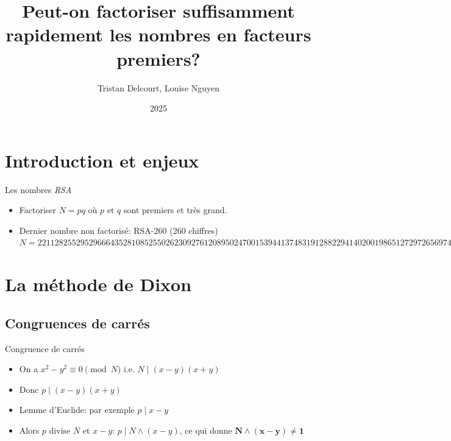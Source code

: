 \documentclass{beamer}
\title{Peut-on factoriser suffisamment rapidement les nombres en facteurs premiers?}
\author{Tristan Delcourt, Louise Nguyen}
\date{2025}
\begin{document}
\begin{frame}[plain]
    \titlepage
\end{frame}

\section{Introduction et enjeux}
\begin{frame}{Les nombres \textit{RSA}}

\begin{itemize}
    \item Factoriser $N = pq$ où $p$ et $q$ sont premiers et très grand.
    \item Dernier nombre non factorisé: RSA-260 (260 chiffres)
        \newline
        \newline
        $N=221128255295296664352810852550262309276120895\allowbreak
        0247001539441374831912882294140200198651272972656\allowbreak
        9746599085900330031400051170742204560859276357953\allowbreak
        7571859542988389587092292384910067030341246205457\allowbreak
        8456641366454068421436129301769402084639106587591\allowbreak
        4794251435144458199$
\end{itemize}

\end{frame}

\section{La méthode de Dixon}
\subsection{Congruences de carrés}
\begin{frame}{Congruence de carrés}

\begin{itemize}[<+->]
\item On a $x^2 - y^2 \equiv 0 \pmod N$ i.e. $N \mid (x-y)(x+y)$
\item Donc $p \mid (x-y)(x+y)$
\item Lemme d'Euclide: par exemple $p \mid x-y$
\item Alors $p$ divise $N$ et $x-y$: $p \mid N \land (x-y)$, ce qui donne $\mathbf{N \land(x-y)\neq1}$
\end{itemize}

    
\end{frame}
\end{document}

